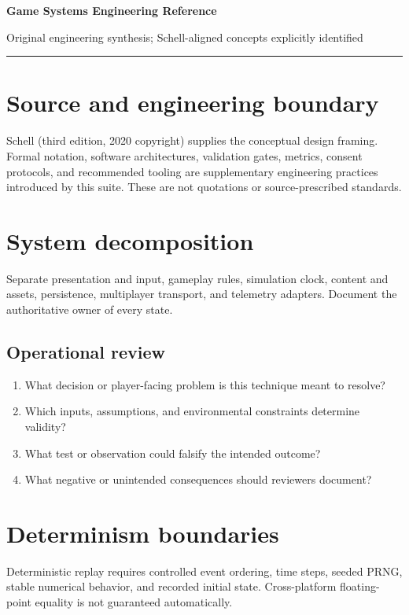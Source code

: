 \documentclass[11pt]{article}
\begin{document}
{\huge\bfseries\color{suiteblue} Game Systems Engineering Reference}\par
\vspace{0.15in}
{\normalsize\color{suitegray} Original engineering synthesis; Schell-aligned concepts explicitly identified}\par
\vspace{0.15in}\hrule\vspace{0.15in}

\section{Source and engineering boundary}
Schell (third edition, 2020 copyright) supplies the conceptual design framing. Formal notation, software architectures, validation gates, metrics, consent protocols, and recommended tooling are supplementary engineering practices introduced by this suite. These are not quotations or source-prescribed standards.


\section{System decomposition}
Separate presentation and input, gameplay rules, simulation clock, content and assets, persistence, multiplayer transport, and telemetry adapters. Document the authoritative owner of every state.


\subsection{Operational review}
\begin{enumerate}
\item What decision or player-facing problem is this technique meant to resolve?
\item Which inputs, assumptions, and environmental constraints determine validity?
\item What test or observation could falsify the intended outcome?
\item What negative or unintended consequences should reviewers document?
\end{enumerate}

\section{Determinism boundaries}
Deterministic replay requires controlled event ordering, time steps, seeded PRNG, stable numerical behavior, and recorded initial state. Cross-platform floating-point equality is not guaranteed automatically.
\end{document}
